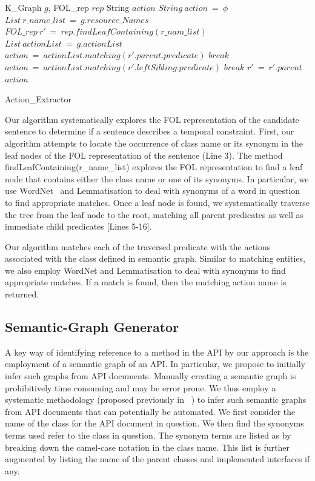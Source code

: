 \begin{algorithm}[t!]
\begin{algorithmic}[1]
\begin{scriptsize}
\REQUIRE K\_Graph $g$, FOL\_rep $rep$ 
\ENSURE String $action$
\STATE $String\ action\ =\ \phi$
\STATE $List\ r\_name\_list\ =\ g.resource\_Names$
\STATE $FOL\_rep\ r'\ =\ rep.findLeafContaining(r\_nam\_list)$
\STATE $List\ actionList\ =\ g.actionList$
		\STATE $action\ =\ actionList.matching(r'.parent.predicate)$
		\STATE $break$
	\ELSE
			\STATE $action\ =\ actionList.matching(r'.leftSibling.predicate)$
			\STATE $break$
		\ENDIF
	\ENDIF
	\STATE $r'\ =\ r'.parent$
\ENDWHILE
\RETURN $action$
\end{scriptsize}
\end{algorithmic}
\caption{Action\_Extractor}
\label{alg:SenAnnotaator}
\end{algorithm} 

Our algorithm systematically explores the FOL representation
of the candidate sentence to determine if a sentence
describes a temporal constraint. First, our algorithm
attempts to locate the occurrence of class name or its synonym
in the leaf nodes of the FOL
representation of the sentence (Line 3). The method
findLeafContaining(r\_name\_list) explores the FOL representation
to find a leaf node that contains either the class name
or one of its synonyms.
In particular, we use WordNet~\cite{wordnet} and Lemmatisation
to deal with synonyms of a word in question to find appropriate
matches. Once a leaf node is found, we systematically
traverse the tree from the leaf node to the root,
matching all parent predicates as well as immediate child
predicates [Lines 5-16].

Our algorithm matches each of the traversed predicate
with the actions associated with the class defined in
semantic graph. Similar to matching entities, we also
employ WordNet and Lemmatisation to deal with
synonyms to find appropriate matches. If a match is
found, then the matching action name is returned.

\subsection{Semantic-Graph Generator}
\label{sub:ACA}

A key way of identifying reference to a method in the API by our approach is the employment of a semantic graph of an API.
In particular, we propose to initially infer such graphs from API documents.
Manually creating a semantic graph is prohibitively time consuming and may be error prone.
We thus employ a systematic methodology (proposed previously in ~\cite{pandita13:WHYPER}) to infer such semantic graphs from API documents that can potentially be automated.
We first consider the name of the class for the API document in question.
We then find the synonyms terms used refer to the class in question.
The synonym terms are listed as by breaking down the camel-case notation in the class name.
This list is further augmented by listing the name of the parent classes and implemented interfaces if any. 


